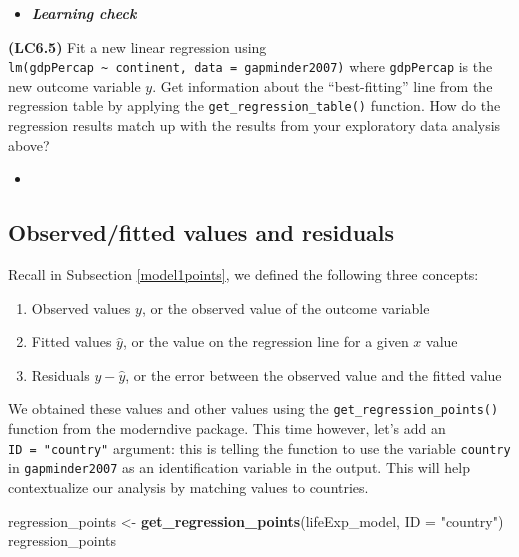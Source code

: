 \documentclass[12pt, krantz2,]{krantz}
\makeatletter
\newenvironment{Shaded}{\begin{snugshade}}{\end{snugshade}}
\newcommand{\DataTypeTok}[1]{\textcolor[rgb]{0.27,0.27,0.27}{#1}}
\newcommand{\KeywordTok}[1]{\textcolor[rgb]{0.27,0.27,0.27}{\textbf{#1}}}
\newcommand{\NormalTok}[1]{#1}
\newcommand{\StringTok}[1]{\textcolor[rgb]{0.5,0.5,0.5}{#1}}
\providecommand{\tightlist}{%
  \setlength{\itemsep}{0pt}\setlength{\parskip}{0pt}}
\newenvironment{kframe}{%
\medskip{}
\setlength{\fboxsep}{.8em}
 \def\at@end@of@kframe{}%
 \ifinner\ifhmode%
  \def\at@end@of@kframe{\end{minipage}}%
  \begin{minipage}{\columnwidth}%
 \fi\fi%
 \def\FrameCommand##1{\hskip\@totalleftmargin \hskip-\fboxsep
 \colorbox{shadecolor}{##1}\hskip-\fboxsep
     \hskip-\linewidth \hskip-\@totalleftmargin \hskip\columnwidth}%
 \MakeFramed {\advance\hsize-\width
   \@totalleftmargin\z@ \linewidth\hsize
   \@setminipage}}%
 {\par\unskip\endMakeFramed%
 \at@end@of@kframe}
\renewenvironment{Shaded}{\begin{kframe}}{\end{kframe}}
\newenvironment{rmdblock}[1]
  {\begin{shaded*}
  \begin{itemize}
  \renewcommand{\labelitemi}{
    \raisebox{-.7\height}[0pt][0pt]{
    }
  }
  \item
  }
  {
  \end{itemize}
  \end{shaded*}
  }
\newenvironment{learncheck}
  {\begin{rmdblock}{warning}}
  {\end{rmdblock}}
\makeatother
\begin{document}
\begin{learncheck}
\textbf{\emph{Learning check}}
\end{learncheck}

\textbf{(LC6.5)} Fit a new linear regression using \texttt{lm(gdpPercap\ \textasciitilde{}\ continent,\ data\ =\ gapminder2007)} where \texttt{gdpPercap} is the new outcome variable \(y\). Get information about the ``best-fitting'' line from the regression table by applying the \texttt{get\_regression\_table()} function. How do the regression results match up with the results from your exploratory data analysis above?

\begin{learncheck}

\end{learncheck}

\hypertarget{model2points}{%
\subsection{Observed/fitted values and residuals}\label{model2points}}

Recall in Subsection \ref{model1points}, we defined the following three concepts:

\begin{enumerate}
\def\labelenumi{\arabic{enumi}.}
\tightlist
\item
  Observed values \(y\), or the observed value of the outcome variable
\item
  Fitted values \(\widehat{y}\), or the value on the regression line for a given \(x\) value
\item
  Residuals \(y - \widehat{y}\), or the error between the observed value and the fitted value
\end{enumerate}

We obtained these values and other values using the \texttt{get\_regression\_points()} function from the moderndive package. This time however, let's add an \texttt{ID\ =\ "country"} argument: this is telling the function to use the variable \texttt{country} in \texttt{gapminder2007} as an identification variable in the output. This will help contextualize our analysis by matching values to countries.

\begin{Shaded}
\begin{Highlighting}[]
\NormalTok{regression_points <-}\StringTok{ }\KeywordTok{get_regression_points}\NormalTok{(lifeExp_model, }\DataTypeTok{ID =} \StringTok{"country"}\NormalTok{)}
\NormalTok{regression_points}
\end{Highlighting}
\end{Shaded}
\end{document}
